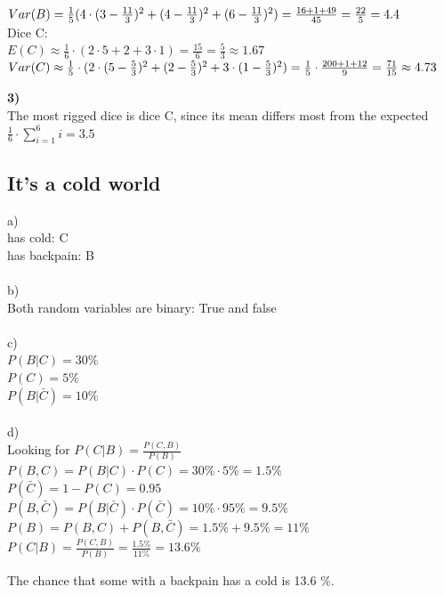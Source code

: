 \documentclass[accentcolor=tud9c]{tudexercise}
\begin{document}
	$ Var(B) = \frac{1}{5}(4\cdot (3-\frac{11}{3})^2 + (4-\frac{11}{3})^2 + (6-\frac{11}{3})^2 )\\
	= \frac{16+1+49}{45} = \frac{22}{5} = 4.4 $\\
	
	\noindent Dice C:\\
	
	$E(C) \approx \frac{1}{6} \cdot (2 \cdot 5 + 2 + 3 \cdot 1) = \frac{15}{6} = \frac{5}{3} \approx 1.67 $\\
	
	$Var(C) \approx \frac{1}{5} \cdot (2 \cdot (5-\frac{5}{3})^2 + (2-\frac{5}{3})^2 + 3 \cdot (1- \frac{5}{3})^2) \\
	= \frac{1}{5} \cdot \frac{200+1+12}{9} = \frac{71}{15} \approx 4.73$
	
	\noindent \textbf{3)}\\
	The most rigged dice is dice C, since its mean differs most from the expected $\frac{1}{6} \cdot \sum_{i=1}^6 i = 3.5 $
	
	\subsection{It's a cold world}
	a)\\
	has cold: C\\
	has backpain: B\\
	\\
	b)\\
	Both random variables are binary: True and false\\
	\\
	c)\\
	$ P(B|C) = 30 \% $\\
	$ P(C) = 5 \% $ \\
	$ P(B|\bar{C})  = 10\%$\\
	\\
	d)\\
	Looking for $P(C|B) = \frac{P(C,B)}{P(B)}$ \\
	$ P(B,C) = P(B|C) \cdot P(C) = 30\% \cdot 5\% = 1.5\% $ \\
	$ P(\bar{C}) = 1-P(C) = 0.95 $\\
	$ P(B, \bar{C}) = P(B|\bar{C}) \cdot P(\bar{C}) = 10 \% \cdot 95\% = 9.5 \%$\\
	$ P(B) = P(B,C) + P(B,\bar{C}) = 1.5\% + 9.5\% = 11\% $
	$ P(C|B)= \frac{P(C,B)}{P(B)} = \frac{1.5\%}{11\%} = 13.6\% $ 
	
	The chance that some with a backpain has a cold is 13.6 \%.
	
\end{document}
